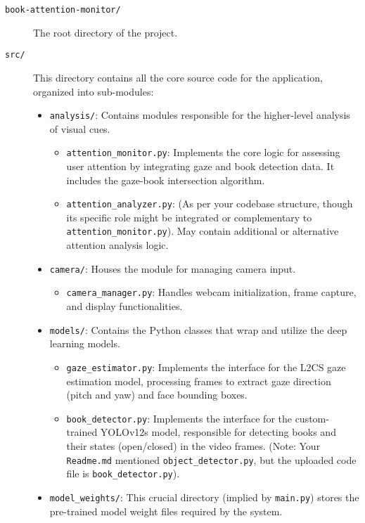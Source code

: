 \begin{description}
    \item[\texttt{book-attention-monitor/}] The root directory of the project.

    \item[\texttt{src/}] This directory contains all the core source code for the application, organized into sub-modules:
    \begin{itemize}
        \item \texttt{analysis/}: Contains modules responsible for the higher-level analysis of visual cues.
        \begin{itemize}
            \item \texttt{attention\_monitor.py}: Implements the core logic for assessing user attention by integrating gaze and book detection data. It includes the gaze-book intersection algorithm.
            \item \texttt{attention\_analyzer.py}: (As per your codebase structure, though its specific role might be integrated or complementary to \texttt{attention\_monitor.py}). May contain additional or alternative attention analysis logic.
        \end{itemize}
        \item \texttt{camera/}: Houses the module for managing camera input.
        \begin{itemize}
            \item \texttt{camera\_manager.py}: Handles webcam initialization, frame capture, and display functionalities.
        \end{itemize}
        \item \texttt{models/}: Contains the Python classes that wrap and utilize the deep learning models.
        \begin{itemize}
            \item \texttt{gaze\_estimator.py}: Implements the interface for the L2CS gaze estimation model, processing frames to extract gaze direction (pitch and yaw) and face bounding boxes.
            \item \texttt{book\_detector.py}: Implements the interface for the custom-trained YOLOv12s model, responsible for detecting books and their states (open/closed) in the video frames. (Note: Your \texttt{Readme.md} mentioned \texttt{object\_detector.py}, but the uploaded code file is \texttt{book\_detector.py}).
        \end{itemize}
        \item \texttt{model\_weights/}: This crucial directory (implied by \texttt{main.py}) stores the pre-trained model weight files required by the system.

\end{itemize}
\end{description}
